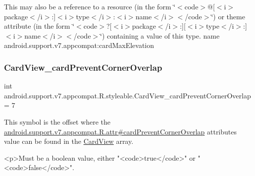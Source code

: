 This may also be a reference to a resource (in the form \char`\"{}$<$code$>$@\mbox{[}$<$i$>$package$<$/i$>$\+:\mbox{]}$<$i$>$type$<$/i$>$\+:$<$i$>$name$<$/i$>$$<$/code$>$\char`\"{}) or theme attribute (in the form \char`\"{}$<$code$>$?\mbox{[}$<$i$>$package$<$/i$>$\+:\mbox{]}\mbox{[}$<$i$>$type$<$/i$>$\+:\mbox{]}$<$i$>$name$<$/i$>$$<$/code$>$\char`\"{}) containing a value of this type.  name android.\+support.\+v7.\+appcompat\+:card\+Max\+Elevation \mbox{\label{classandroid_1_1support_1_1v7_1_1appcompat_1_1R_1_1styleable_ad6fbcf3bd5eaf04f6d84e580634fbbda}} 
\subsubsection{\texorpdfstring{Card\+View\+\_\+card\+Prevent\+Corner\+Overlap}{CardView\_cardPreventCornerOverlap}}
{\footnotesize\ttfamily int android.\+support.\+v7.\+appcompat.\+R.\+styleable.\+Card\+View\+\_\+card\+Prevent\+Corner\+Overlap = 7\hspace{0.3cm}{\ttfamily [static]}}

This symbol is the offset where the \hyperlink{classandroid_1_1support_1_1v7_1_1appcompat_1_1R_1_1attr_a229805ad136083f3fc03e00ad650e071}{android.\+support.\+v7.\+appcompat.\+R.\+attr\#card\+Prevent\+Corner\+Overlap} attribute\textquotesingle{}s value can be found in the \hyperlink{classandroid_1_1support_1_1v7_1_1appcompat_1_1R_1_1styleable_aee2dd81febffbeeaeff51a35af0f87ec}{Card\+View} array.

\begin{DoxyVerb}      <p>Must be a boolean value, either "<code>true</code>" or "<code>false</code>".
\end{DoxyVerb}
 

